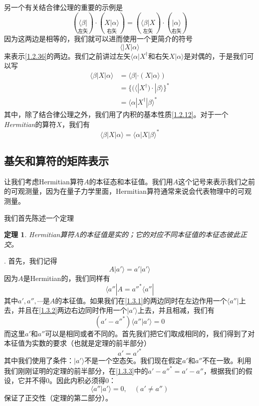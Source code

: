 \documentclass[UTF8,twoside]{ctexart}
\newtheorem{theo}{定理}[section]
\def\be{\begin{equation}}
\def\ee{\end{equation}}
\begin{document}
另一个有关结合律公理的重要的示例是
\be\label{1.2.36}
(\underset{\text{左矢}}{\langle\beta|})\cdot(\underset{\text{右矢}}{X|\alpha\rangle}) = (\underset{\text{左矢}}{\langle\beta|X})\cdot(\underset{\text{右矢}}{|\alpha\rangle})
\ee
因为这两边是相等的，我们就可以进而使用一个更简介的符号
\be
\langle|X|\alpha\rangle
\ee
来表示\eqref{1.2.36}的两边。我们之前讲过左矢$\langle\alpha|X^\dagger$和右矢$X|\alpha\rangle$是对偶的，于是我们可以写
\be\label{1.2.38}
\begin{split}
\langle\beta|X|\alpha\rangle& = \langle\beta|\cdot(X|\alpha\rangle)\\
&=\{(\langle|X^\dagger)\cdot|\beta\rangle\}^*\\
&=\langle\alpha|X^\dagger|\beta\rangle^*
\end{split}
\ee
其中，除了结合律公理之外，我们用了内积的基本性质\eqref{1.2.12}。对于一个{\it Hermitian}的算符$X$，我们有
\be
\langle\beta|X|\alpha\rangle = \langle\alpha|X|\beta\rangle^*
\ee



\subsection{基矢和算符的矩阵表示}


\noindent 让我们考虑Hermitian算符$A$的本征态和本征值。我们用$A$这个记号来表示我们之前的可观测量，因为在量子力学里面，Hermitian算符通常来说会代表物理中的可观测量。

我们首先陈述一个定理

\begin{theo}
Hermitian算符$A$的本征值是实的；它的对应不同本征值的本征态彼此正交。
\end{theo}

. 首先，我们记得
\be\label{1.3.1}
A|a'\rangle = a'|a'\rangle
\ee
因为$A$是Hermitian的，我们同样有
\be\label{1.3.2}
\langle a''|A = a''^*\langle a''|
\ee
其中$a',a'',\cdots$是$A$的本征值。如果我们在\eqref{1.3.1}的两边同时在左边作用一个$\langle a''|$上去，并且在\eqref{1.3.2}两边右边同时作用一个$|a'\rangle$上去，并且相减，我们有
\be\label{1.3.3}
(a'-a''^*)\langle a''|a'\rangle = 0
\ee
而这里$a'$和$a''$可以是相同或者不同的。首先我们把它们取成相同的，我们得到了对本征值为实数的要求（也就是定理的前半部分）
\be
a' = a'^*
\ee
其中我们使用了条件：$|a'\rangle$不是一个空态矢。我们现在假定$a'$和$a''$不在一致。利用我们刚刚证明的定理的前半部分，在\eqref{1.3.3}中的$a'-a''^*=a'-a''$，根据我们的假设，它并不得$0$。因此内积必须得$0$：
\be
\langle a''|a'\rangle = 0,\quad (a' \neq a'')
\ee
保证了正交性（定理的第二部分）。\ \\
\end{document}
